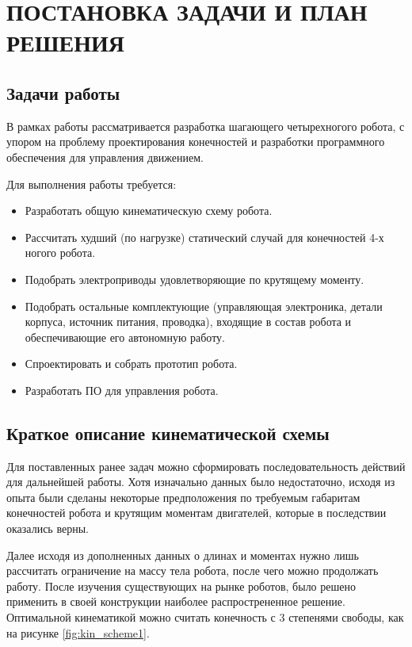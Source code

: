 \chapter{\MakeUppercase{Постановка задачи и план решения}}

\section{Задачи работы}

В рамках работы рассматривается разработка шагающего четырехногого робота, с упором на проблему проектирования конечностей и разработки программного обеспечения для управления движением.

Для выполнения работы требуется:
\begin{itemize}
    \item Разработать общую кинематическую схему робота.
    \item Рассчитать худший (по нагрузке) статический случай для конечностей 4-х ногого робота.
    \item Подобрать электроприводы удовлетворяющие по крутящему моменту.
    \item Подобрать остальные комплектующие (управляющая электроника, детали корпуса, источник питания, проводка), входящие в состав робота и обеспечивающие его автономную работу.
    \item Спроектировать и собрать прототип робота.
    \item Разработать ПО для управления робота.
\end{itemize}

\section{Краткое описание кинематической схемы}

Для поставленных ранее задач можно сформировать последовательность действий для дальнейшей работы. Хотя изначально данных было недостаточно, исходя из опыта были сделаны некоторые предположения по требуемым габаритам конечностей робота и крутящим моментам двигателей, которые в последствии оказались верны.

Далее исходя из дополненных данных о длинах и моментах нужно лишь рассчитать ограничение на массу тела робота, после чего можно продолжать работу. После изучения существующих на рынке роботов, было решено применить в своей конструкции наиболее распрострененное решение. Оптимальной кинематикой можно считать конечность с 3 степенями свободы, как на рисунке \ref{fig:kin_scheme1}.

